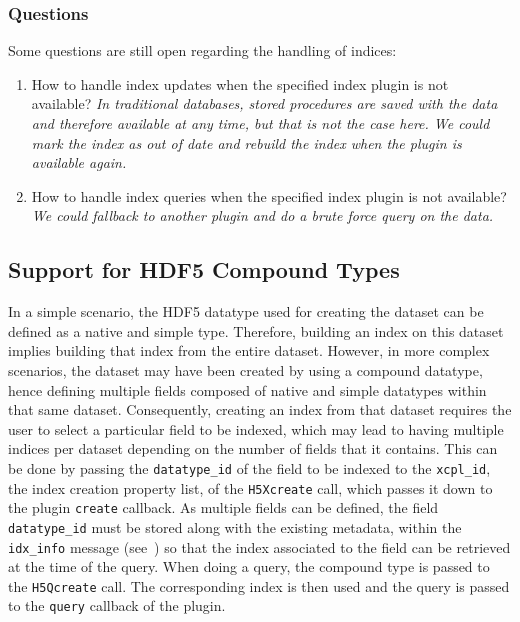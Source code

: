 \subsubsection*{Questions}
Some questions are still open regarding the handling of indices:
\begin{enumerate}
\item How to handle index updates when the specified index plugin is not available?
\textit{In traditional databases, stored procedures are saved with the data and
therefore available at any time, but that is not the case here.
We could mark the index as out of date and rebuild the index when the plugin is
available again.}
\item How to handle index queries when the specified index plugin is not
available? \textit{We could fallback to another plugin and do a brute force query on the data.}
\end{enumerate}

\subsection{Support for HDF5 Compound Types}

In a simple scenario, the HDF5 datatype used for creating the dataset can be defined
as a native and simple type. Therefore, building an index on this dataset implies
building that index from the entire dataset. However, in more complex scenarios, the
dataset may have been created by using a compound datatype, hence defining
multiple fields composed of native and simple datatypes within that same dataset.
Consequently, creating an index from that dataset requires the user to select a
particular field to be indexed, which may lead to having multiple indices per dataset
depending on the number of fields that it contains. This can be done by passing
the \texttt{datatype\_id} of the field to be indexed to the \texttt{xcpl\_id},
the index creation property list, of the \texttt{H5Xcreate} call, which passes
it down to the plugin \texttt{create} callback. As multiple fields can be defined,
the field \texttt{datatype\_id} must be stored along with the existing metadata, within the
\texttt{idx\_info} message (see~) so that the index
associated to the field can be retrieved at the time of the query.
When doing a query, the compound type is passed to the \texttt{H5Qcreate} call.
The corresponding index is then used and the query is passed to the \texttt{query}
callback of the plugin.


